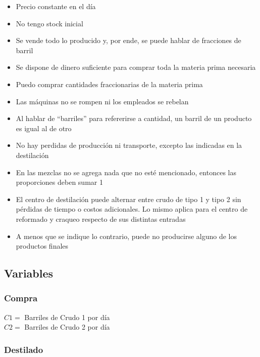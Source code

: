 \documentclass[a4paper,10pt]{article}
\begin{document}
\begin{itemize}
 \item {Precio constante en el d\'ia}
 \item {No tengo stock inicial}
 \item {Se vende todo lo producido y, por ende, se puede hablar de fracciones de barril}
 \item {Se dispone de dinero suficiente para comprar toda la materia prima necesaria}
 \item {Puedo comprar cantidades fraccionarias de la materia prima}
 \item {Las m\'aquinas no se rompen ni los empleados se rebelan}
 \item {Al hablar de ``barriles'' para refererirse a cantidad, un barril de un producto es igual al de otro}
 \item {No hay perdidas de producci\'on ni transporte, excepto las indicadas en la destilaci\'on}
 \item {En las mezclas no se agrega nada que no est\'e mencionado, entonces las proporciones deben sumar 1}
 \item {El centro de destilaci\'on puede alternar entre crudo de tipo 1 y tipo 2 sin p\'erdidas de tiempo o costos adicionales. Lo mismo aplica para el centro de reformado y craqueo respecto de sus distintas entradas}
 \item {A menos que se indique lo contrario, puede no producirse alguno de los productos finales}
 
 
 
\end{itemize}
	
\newpage

\subsection{Variables}


\subsubsection{Compra}
\vspace{5mm}

$C1 = $ Barriles de Crudo 1 por d\'ia \\

$C2 = $ Barriles de Crudo 2 por d\'ia \\
\vspace{2mm}

\subsubsection{Destilado}
\vspace{5mm}
\end{document}
